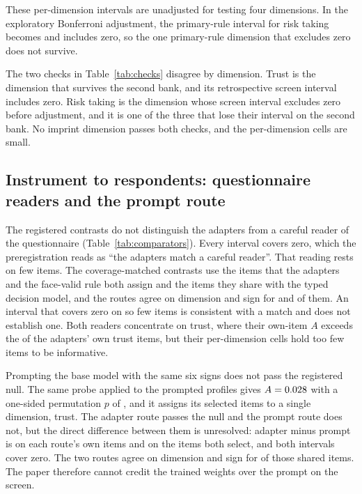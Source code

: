 These per-dimension intervals are unadjusted for testing four dimensions. In the exploratory Bonferroni adjustment, the primary-rule interval for risk taking becomes  and includes zero, so the one primary-rule dimension that excludes zero does not survive.

The two checks in Table~\ref{tab:checks} disagree by dimension. Trust is the dimension that survives the second bank, and its retrospective screen interval includes zero. Risk taking is the dimension whose screen interval excludes zero before adjustment, and it is one of the three that lose their interval on the second bank. No imprint dimension passes both checks, and the per-dimension cells are small.

\subsection{Instrument to respondents: questionnaire readers and the prompt route}\label{sec:res-comparators}



The registered contrasts do not distinguish the adapters from a careful reader of the questionnaire (Table~\ref{tab:comparators}). Every interval covers zero, which the preregistration reads as ``the adapters match a careful reader''. That reading rests on few items. The coverage-matched contrasts use the  items that the adapters and the face-valid rule both assign and the  items they share with the typed decision model, and the routes agree on dimension and sign for  and  of them. An interval that covers zero on so few items is consistent with a match and does not establish one. Both readers concentrate on trust, where their own-item $A$ exceeds the  of the adapters' own trust items, but their per-dimension cells hold too few items to be informative.

Prompting the base model with the same six signs does not pass the registered null. The same probe applied to the  prompted profiles gives $A=\cl{0.028}{SP_A_primary}$  with a one-sided permutation $p$ of , and it assigns its selected items to a single dimension, trust. The adapter route passes the null and the prompt route does not, but the direct difference between them is unresolved: adapter minus prompt is  on each route's own items and  on the  items both select, and both intervals cover zero. The two routes agree on dimension and sign for  of those shared items. The paper therefore cannot credit the trained weights over the prompt on the screen.

